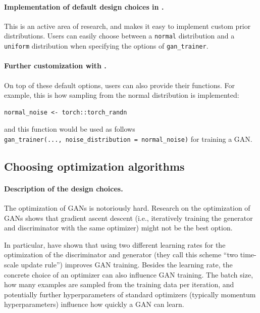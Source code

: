 \paragraph{\texorpdfstring{Implementation of default design choices in .}{Implementation of default design choices in .}}\label{implementation-of-default-design-choices-in-.-2}

This is an active area of research, and  makes it easy to implement custom prior distributions. Users can easily choose between a \texttt{normal} distribution and a \texttt{uniform} distribution when specifying the options of \texttt{gan\_trainer}.

\paragraph{\texorpdfstring{Further customization with .}{Further customization with .}}\label{further-customization-with-.-2}

On top of these default options, users can also provide their functions. For example, this is how sampling from the normal distribution is implemented:

\begin{verbatim}
normal_noise <- torch::torch_randn
\end{verbatim}

and this function would be used as follows \texttt{gan\_trainer(...,\ noise\_distribution\ =\ normal\_noise)} for training a GAN.

\subsection{Choosing optimization algorithms}\label{sec:optimizer}

\paragraph{Description of the design choices.}\label{description-of-the-design-choices.-3}

The optimization of GANs is notoriously hard. Research on the optimization of GANs shows \citep[see, e.g.,][]{heusel2017, schaefer2019} that gradient ascent descent (i.e., iteratively training the generator and discriminator with the same optimizer) might not be the best option.

In particular, \citet{heusel2017} have shown that using two different learning rates for the optimization of the discriminator and generator (they call this scheme ``two time-scale update rule'') improves GAN training. Besides the learning rate, the concrete choice of an optimizer can also influence GAN training. The batch size, how many examples are sampled from the training data per iteration, and potentially further hyperparameters of standard optimizers (typically momentum hyperparameters) influence how quickly a GAN can learn.

